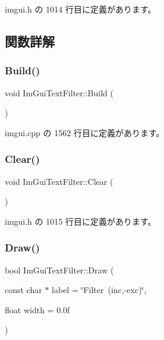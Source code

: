  imgui.\+h の 1014 行目に定義があります。



\subsection{関数詳解}
\mbox{\label{struct_im_gui_text_filter_aef362baafaa9dfa62d11bc6101c0f4c1}} 
\subsubsection{\texorpdfstring{Build()}{Build()}}
{\footnotesize\ttfamily void Im\+Gui\+Text\+Filter\+::\+Build (\begin{DoxyParamCaption}{ }\end{DoxyParamCaption})}



 imgui.\+cpp の 1562 行目に定義があります。

\mbox{\label{struct_im_gui_text_filter_a9043c1f0c33d29e6fc9b75ae81f9705a}} 
\subsubsection{\texorpdfstring{Clear()}{Clear()}}
{\footnotesize\ttfamily void Im\+Gui\+Text\+Filter\+::\+Clear (\begin{DoxyParamCaption}{ }\end{DoxyParamCaption})\hspace{0.3cm}{\ttfamily [inline]}}



 imgui.\+h の 1015 行目に定義があります。

\mbox{\label{struct_im_gui_text_filter_ab93ad5985019ff9d3781606551fc26cc}} 
\subsubsection{\texorpdfstring{Draw()}{Draw()}}
{\footnotesize\ttfamily bool Im\+Gui\+Text\+Filter\+::\+Draw (\begin{DoxyParamCaption}\item[{const char $\ast$}]{label = {\ttfamily \char`\"{}Filter~(inc,-\/exc)\char`\"{}},  }\item[{float}]{width = {\ttfamily 0.0f} }\end{DoxyParamCaption})}



